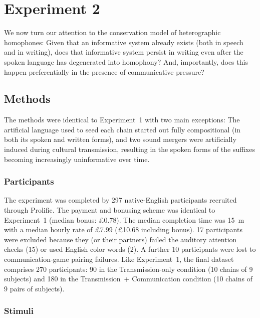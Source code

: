 \documentclass[doc,biblatex]{apa7}
\begin{document}

\section{Experiment 2}

We now turn our attention to the conservation model of heterographic homophones: Given that an informative system already exists (both in speech and in writing), does that informative system persist in writing even after the spoken language has degenerated into homophony? And, importantly, does this happen preferentially in the presence of communicative pressure?

\subsection{Methods}

The methods were identical to Experiment~1 with two main exceptions: The artificial language used to seed each chain started out fully compositional (in both its spoken and written forms), and two sound mergers were artificially induced during cultural transmission, resulting in the spoken forms of the suffixes becoming increasingly uninformative over time.

\subsubsection{Participants}

The experiment was completed by 297 native-English participants recruited through Prolific. The payment and bonusing scheme was identical to Experiment~1 (median bonus: £0.78). The median completion time was 15~m with a median hourly rate of £7.99 (£10.68 including bonus). 17 participants were excluded because they (or their partners) failed the auditory attention checks (15) or used English color words (2). A further 10 participants were lost to communication-game pairing failures. Like Experiment~1, the final dataset comprises 270 participants: 90 in the Transmission-only condition (10 chains of 9 subjects) and 180 in the Transmission~+ Communication condition (10 chains of 9 pairs of subjects).

\subsubsection{Stimuli}
\end{document}
